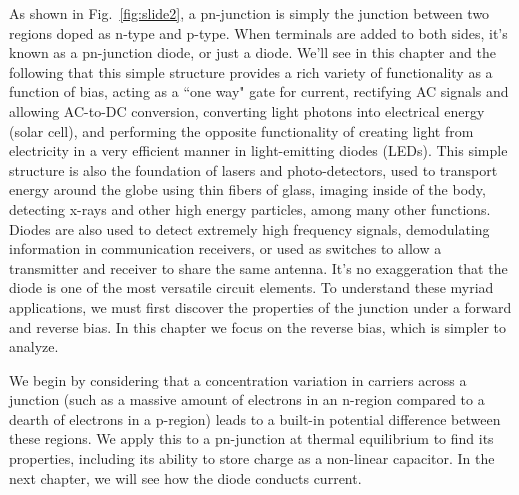 As shown in Fig.~\ref{fig:slide2}, a pn-junction is simply the junction between two regions doped as n-type and p-type.  When terminals are added to both sides, it's known as a pn-junction diode, or just a diode.  We'll see in this chapter and the following that this simple structure provides a rich variety of functionality as a function of bias, acting as a ``one way" gate for current, rectifying AC signals and allowing AC-to-DC conversion, converting light photons into electrical energy (solar cell), and performing the opposite functionality of creating light from electricity in a very efficient manner in light-emitting diodes (LEDs).  This simple structure is also the foundation of lasers and photo-detectors, used to transport energy around the globe using thin fibers of glass, imaging inside of the body, detecting x-rays and other high energy particles, among many other functions.   Diodes are also used to detect extremely high frequency signals, demodulating information in communication receivers, or used as switches to allow a transmitter and receiver to share the same antenna.  It's no exaggeration that the diode is one of the most versatile circuit elements.  To understand these myriad applications, we must first discover the properties of the junction under a forward and reverse bias.  In this chapter we focus on the reverse bias, which is simpler to analyze.

We begin by considering that a concentration variation in carriers across a junction (such as a massive amount of electrons in an n-region compared to a dearth of electrons in a p-region) leads to a built-in potential difference between these regions.  We apply this to a pn-junction at thermal equilibrium to find its properties, including its ability to store charge as a non-linear capacitor.  In the next chapter, we will see how the diode conducts current.
